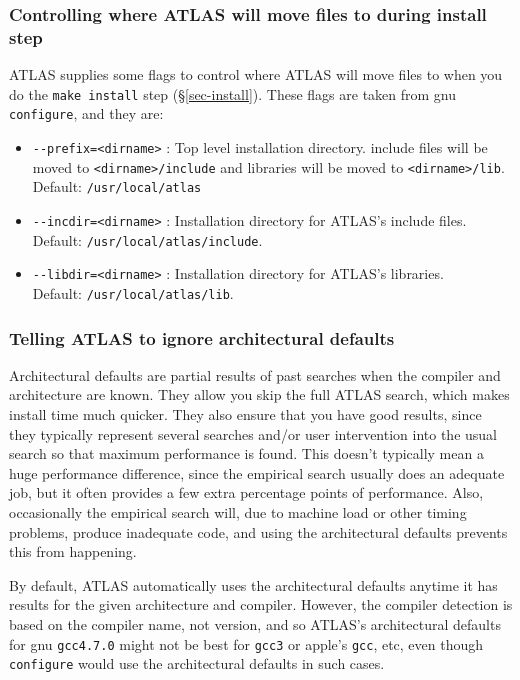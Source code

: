 \documentclass[11pt]{article}
\begin{document}
\subsubsection{Controlling where ATLAS will move files to during install step}
ATLAS supplies some flags to control where ATLAS will move files to when
you do the {\tt make install} step (\S\ref{sec-install}).  These flags
are taken from gnu {\tt configure}, and they are:
\begin{itemize}
\item \verb|--prefix=<dirname>| : Top level installation directory.
      include files will be moved to \verb|<dirname>/include| and
      libraries will be moved to \verb|<dirname>/lib|.
      Default: {\tt /usr/local/atlas}
\item \verb|--incdir=<dirname>| : Installation directory for ATLAS's
      include files.  Default: {\tt /usr/local/atlas/include}.
\item \verb|--libdir=<dirname>| : Installation directory for ATLAS's
      libraries. \\ Default: {\tt /usr/local/atlas/lib}.
\end{itemize}

\subsubsection{Telling ATLAS to ignore architectural defaults}
\label{sec-nodefaults}
Architectural defaults are partial results of past searches when
the compiler and architecture are known.  They allow you skip the
full ATLAS search, which makes install time much quicker.  They also
ensure that you have good results, since they typically represent
several searches and/or user intervention into the usual search so
that maximum performance is found.  This doesn't typically mean a huge
performance difference, since the empirical search usually does an adequate
job, but it often provides a few extra percentage points of performance.  Also,
occasionally the empirical search will, due to machine load or other timing
problems, produce inadequate code, and using the architectural defaults
prevents this from happening.

By default, ATLAS automatically uses the architectural defaults anytime
it has results for the given architecture and compiler.  However, the
compiler detection is based on the compiler name, not version, and so
ATLAS's architectural defaults for gnu {\tt gcc4.7.0} might not be best
for {\tt gcc3} or apple's {\tt gcc}, etc, even though {\tt configure} would
use the architectural defaults in such cases.
\end{document}
